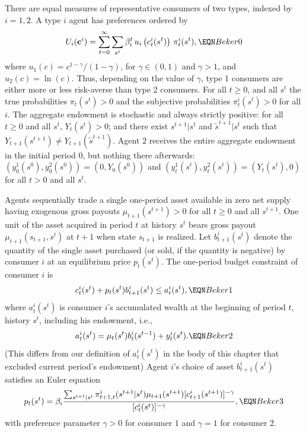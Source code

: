 There are equal measures of   representative consumers    of two types, indexed by $i=1,2$.
A type  $i$ agent  has preferences ordered by
$$ U_i({\bf c}^i) =
   \sum_{t=0}^\infty \sum_{s^t} \beta_i^t 
               \,u_i\left(c_t^i(s^t)\right)\,
   \pi_t^i(s^t),  \EQN Beker0 $$
where  $u_1(c)=c^{1-\gamma}/(1-\gamma)$,
for $\gamma\in(0,1)$ and $\gamma> 1$, and  $u_2(c) = \ln (c)$. Thus, depending on the value of
$\gamma$, type 1 consumers are either 
more or less risk-averse than type 2 consumers. 
For all $t\geq0$, and all $s^t$ the true
probabilities $\pi_t(s^t)>0$ and the subjective probabilities
$\pi_t^i(s^t)>0$ for all $i$.
The aggregate endowment is stochastic and always strictly positive:
for all $t\geq 0$ and all $s^t$, $Y_t(s^t)>0$; and there exist
$s^{t+1}|s^t$ and $\tilde s^{t+1}|s^t$ such that
$Y_{t+1}(s^{t+1}) \neq Y_{t+1}(\tilde s^{t+1})$.
Agent $2$ receives the entire aggregate
endowment  in the initial period $0$,
but nothing there afterwards: $(y_0^1(s^0), y_0^2(s^0)) = (0, Y_0(s^0))$ and
$(y_t^1(s^t), y_t^2(s^t)) = (Y_t(s^t), 0)$ for all $t> 0$
and all $s^t$.



Agents sequentially trade  a single one-period asset
available in zero net supply having exogenous gross
payouts $\mu_{t+1}(s^{t+1})>0$ for all $t\ge0$ and all $s^{t+1}$.
One unit of the asset acquired in period $t$ at history $s^t$ bears
 gross payout $\mu_{t+1}(s_{t+1}, s^t)$ at $t+1$  when
state $s_{t+1}$ is realized. Let $b^i_{t+1}(s^t)$ denote the quantity of
the single asset purchased (or sold, if the quantity is negative)
by consumer $i$ at an equilibrium price $p_t(s^t)$.
The one-period budget constraint of consumer $i$ is
$$ c^i_t(s^t) + p_t(s^t) b^i_{t+1}(s^t) \leq a^i_t(s^t),  \EQN Beker1
$$
where $a^i_t(s^t)$ is consumer $i$'s accumulated wealth at the beginning
of period $t$, history $s^t$, including his endowment, i.e.,
$$ a^i_t(s^t) = \mu_t(s^t) b^i_t(s^{t-1}) + y^i_t(s^t).  \EQN Beker2
$$
(This differs from our definition of $a^i_t(s^t)$
in the body of this chapter
that excluded current period's endowment)
Agent $i$'s choice of asset $b^i_{t+1}(s^t)$ satisfies an Euler equation
$$
p_t(s^t) = \beta_i {\sum_{s^{t+1} | s^t} 
\pi^i_{t+1,t}(s^{t+1}| s^t)
\mu_{t+1}(s^{t+1}) [c^i_{t+1}(s^{t+1})]^{-\gamma} \over
[c^i_t(s^t)]^{-\gamma} },                                 \EQN Beker3
$$
with preference parameter $\gamma>0$ for consumer $1$ and $\gamma=1$ for
consumer $2$.

